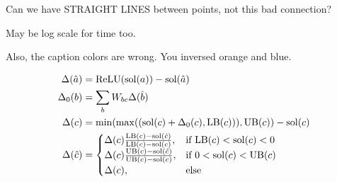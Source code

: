 	
Can we have STRAIGHT LINES between points, not this bad connection?

May be log scale for time too.

Also, the caption colors are wrong. You inversed orange and blue.



\begin{align*}
	\Delta(\hat{a}) &= \mathrm{ReLU}(\mathrm{sol}(a))-\mathrm{sol}(\hat{a})\\
	\Delta_0(b) &= \sum_{b} W_{bc}\Delta(\hat{b})\\
	\Delta(c) &= \min(\max((\mathrm{sol}(c)+\Delta_0(c),\mathrm{LB}(c))),\mathrm{UB}(c))-\mathrm{sol}(c)\\
	\Delta(\hat{c}) &=
	\begin{cases}
		\Delta(c)\frac{\mathrm{LB}(c) - \mathrm{sol}(\hat{c})}{\mathrm{LB}(c) - \mathrm{sol}(c)},  &\text{if } \mathrm{LB}(c)< \mathrm{sol}(c) < 0\\
		\Delta(c)\frac{\mathrm{UB}(c) - \mathrm{sol}(\hat{c})}{\mathrm{UB}(c) - \mathrm{sol}(c)},  &\text{if }  0< \mathrm{sol}(c) < \mathrm{UB}(c)\\
		\Delta(c),  &\text{else } 	 
	\end{cases}
\end{align*}